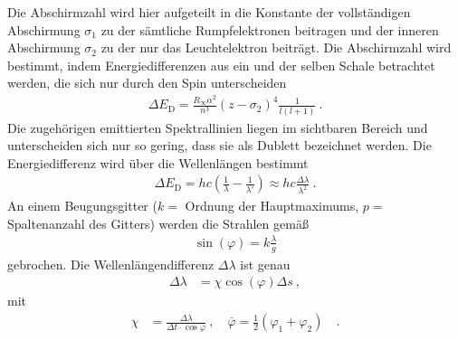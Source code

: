 Die Abschirmzahl wird hier aufgeteilt in die Konstante der  vollständigen Abschirmung $\sigma_1$ zu der sämtliche Rumpfelektronen beitragen und der inneren Abschirmung $\sigma_2$ zu der nur das Leuchtelektron beiträgt. Die Abschirmzahl wird bestimmt, indem Energiedifferenzen aus ein und der selben Schale betrachtet werden, die sich nur durch den Spin unterscheiden
\begin{align}\label{Abschirm}
	\Delta E_\text{D} = \frac{R_\infty\alpha^2}{n^3}(z-\sigma_2)^4\frac{1}{l(l+1)} \ .
\end{align}
Die zugehörigen emittierten Spektrallinien liegen im sichtbaren Bereich und unterscheiden sich nur so gering, dass sie als Dublett bezeichnet werden. Die Energiedifferenz wird über die Wellenlängen bestimmt
\begin{align}\label{DeltaE}
	\Delta E_\text{D} = hc\left(\frac{1}{\lambda}-\frac{1}{\lambda'}\right) \approx hc\frac{\Delta \lambda}{\lambda^2} \ .
\end{align}
An einem Beugungsgitter ($k =$ Ordnung der Hauptmaximums, $p =$ Spaltenanzahl des Gitters) werden die Strahlen gemäß
\begin{align}\label{Gitterkonstante}
	\sin(\varphi) = k\frac{\lambda}{g}
\end{align}
gebrochen.
Die Wellenlängendifferenz $\Delta \lambda$ ist genau
\begin{align}\label{DeltaLambda}
	\Delta \lambda &= \chi \cos(\varphi)\Delta s \ ,
\end{align}	
mit
\begin{align}\label{Eichgrosse}
	\chi &= \frac{\Delta\lambda}{\Delta t\cdot\cos\overline{\varphi}} \ , \quad \overline{\varphi} = \frac{1}{2}(\varphi_1 + \varphi_2) \quad .
\end{align}